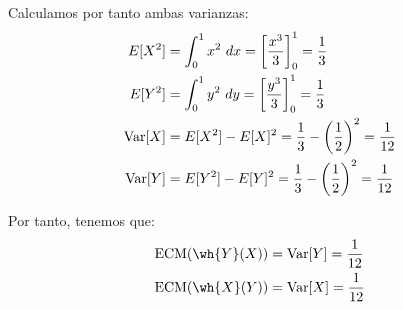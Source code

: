 \begin{ejercicio}
    Calculamos por tanto ambas varianzas:
    \begin{align*}
        E[X^2] &= \int_{0}^{1} x^2 \ dx = \left[\dfrac{x^3}{3}\right]_{0}^{1} = \dfrac{1}{3}\\
        E[Y^2] &= \int_{0}^{1} y^2 \ dy = \left[\dfrac{y^3}{3}\right]_{0}^{1} = \dfrac{1}{3}\\
        \operatorname{Var}[X] &= E[X^2]-E[X]^2 = \dfrac{1}{3}-\left(\dfrac{1}{2}\right)^2 = \dfrac{1}{12}\\
        \operatorname{Var}[Y] &= E[Y^2]-E[Y]^2 = \dfrac{1}{3}-\left(\dfrac{1}{2}\right)^2 = \dfrac{1}{12}
    \end{align*}

    Por tanto, tenemos que:
    \begin{align*}
        \text{ECM}(\wh{Y}(X)) &= \Var[Y] = \dfrac{1}{12}\\
        \text{ECM}(\wh{X}(Y)) &= \Var[X] = \dfrac{1}{12}
    \end{align*}
\end{ejercicio}

